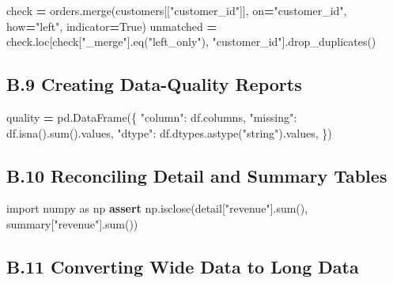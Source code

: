 \documentclass[
  12pt,
]{article}
\newenvironment{Shaded}{\begin{snugshade}}{\end{snugshade}}
\newcommand{\BuiltInTok}[1]{#1}
\newcommand{\ControlFlowTok}[1]{\textcolor[rgb]{0.13,0.29,0.53}{\textbf{#1}}}
\newcommand{\ImportTok}[1]{#1}
\newcommand{\NormalTok}[1]{#1}
\newcommand{\OperatorTok}[1]{\textcolor[rgb]{0.81,0.36,0.00}{\textbf{#1}}}
\newcommand{\StringTok}[1]{\textcolor[rgb]{0.31,0.60,0.02}{#1}}
\newcommand{\VariableTok}[1]{\textcolor[rgb]{0.00,0.00,0.00}{#1}}
\begin{document}
\begin{Shaded}
\begin{Highlighting}[]
\NormalTok{check }\OperatorTok{=}\NormalTok{ orders.merge(customers[[}\StringTok{"customer\_id"}\NormalTok{]], on}\OperatorTok{=}\StringTok{"customer\_id"}\NormalTok{, how}\OperatorTok{=}\StringTok{"left"}\NormalTok{, indicator}\OperatorTok{=}\VariableTok{True}\NormalTok{)}
\NormalTok{unmatched }\OperatorTok{=}\NormalTok{ check.loc[check[}\StringTok{"\_merge"}\NormalTok{].eq(}\StringTok{"left\_only"}\NormalTok{), }\StringTok{"customer\_id"}\NormalTok{].drop\_duplicates()}
\end{Highlighting}
\end{Shaded}

\subsection{B.9 Creating Data-Quality
Reports}\label{b.9-creating-data-quality-reports}

\begin{Shaded}
\begin{Highlighting}[]
\NormalTok{quality }\OperatorTok{=}\NormalTok{ pd.DataFrame(\{}
    \StringTok{"column"}\NormalTok{: df.columns,}
    \StringTok{"missing"}\NormalTok{: df.isna().}\BuiltInTok{sum}\NormalTok{().values,}
    \StringTok{"dtype"}\NormalTok{: df.dtypes.astype(}\StringTok{"string"}\NormalTok{).values,}
\NormalTok{\})}
\end{Highlighting}
\end{Shaded}

\subsection{B.10 Reconciling Detail and Summary
Tables}\label{b.10-reconciling-detail-and-summary-tables}

\begin{Shaded}
\begin{Highlighting}[]
\ImportTok{import}\NormalTok{ numpy }\ImportTok{as}\NormalTok{ np}
\ControlFlowTok{assert}\NormalTok{ np.isclose(detail[}\StringTok{"revenue"}\NormalTok{].}\BuiltInTok{sum}\NormalTok{(), summary[}\StringTok{"revenue"}\NormalTok{].}\BuiltInTok{sum}\NormalTok{())}
\end{Highlighting}
\end{Shaded}

\subsection{B.11 Converting Wide Data to Long
Data}\label{b.11-converting-wide-data-to-long-data}
\end{document}
